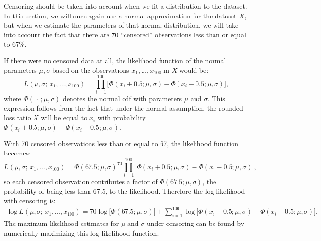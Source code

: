 \documentclass{article}
\begin{document}
Censoring should be taken into account when we fit a distribution to the dataset. In this section, we will once again use a normal approximation for the dataset $X$, but when we estimate the parameters of that normal distribution, we will take into account the fact that there are 70 ``censored'' observations less than or equal to 67\%.

If there were no censored data at all, the likelihood function of the normal parameters $\mu, \sigma$ based on the observations $x_1, \ldots, x_{100}$ in $X$ would be:
\[
  L(\mu,\sigma;\,x_1,\ldots,x_{100}) = \prod_{i=1}^{100}\bigl[\Phi(x_i+0.5;\mu,\sigma) - \Phi(x_i-0.5;\mu,\sigma)\bigr],
\]
where $\Phi(\,\cdot\,;\mu,\sigma)$ denotes the normal cdf with parameters $\mu$ and $\sigma$. This expression follows from the fact that under the normal assumption, the rounded loss ratio $X$ will be equal to $x_i$ with probability $\Phi(x_i+0.5;\mu,\sigma) - \Phi(x_i-0.5;\mu,\sigma)$.

With 70 censored observations less than or equal to 67, the likelihood function becomes:
\[
  L(\mu,\sigma;\,x_1,\ldots,x_{100}) = \Phi(67.5;\mu,\sigma)^{70}\prod_{i=1}^{100}\bigl[\Phi(x_i+0.5;\mu,\sigma) - \Phi(x_i-0.5;\mu,\sigma)\bigr],
\]
so each censored observation contributes a factor of $\Phi(67.5;\mu,\sigma)$, the probability of being less than 67.5, to the likelihood. Therefore the log-likelihood with censoring is:
\begin{align*}
  \log L(\mu,\sigma;\,x_1,\ldots,x_{100})
  = 70\log\bigl[\Phi(67.5;\mu,\sigma)\bigr]
  + \sum_{i=1}^{100}\log\bigl[\Phi(x_i+0.5;\mu,\sigma) - \Phi(x_i-0.5;\mu,\sigma)\bigr].
\end{align*}
The maximum likelihood estimates for $\mu$ and $\sigma$ under censoring can be found by numerically maximizing this log-likelihood function.
\end{document}
